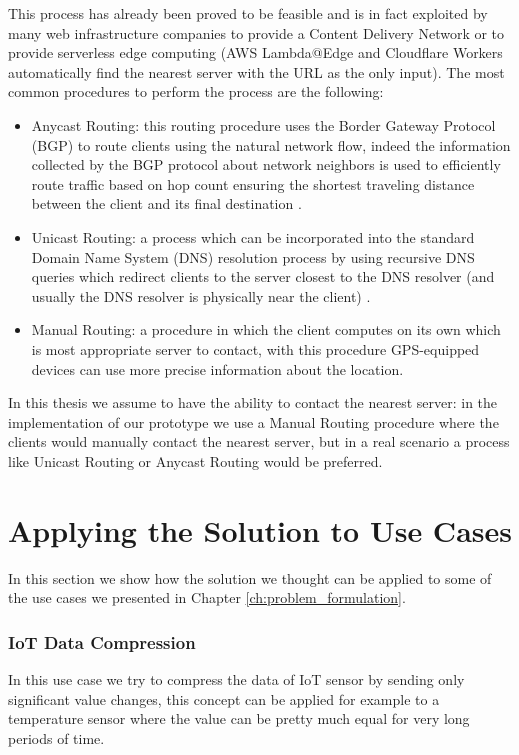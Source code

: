 This process has already been proved to be feasible and is in fact exploited by many web infrastructure companies to provide a Content Delivery Network or to provide serverless edge computing (AWS Lambda@Edge and Cloudflare Workers automatically find the nearest server with the URL as the only input). The most common procedures to perform the process are the following:
\begin{itemize}
    \item Anycast Routing: this routing procedure uses the Border Gateway Protocol (BGP) to route clients using the natural network flow, indeed the information collected by the BGP protocol about network neighbors is used to efficiently route traffic based on hop count ensuring the shortest traveling distance between the client and its final destination \cite{anycast-cloudflare}.
    \item Unicast Routing: a process which can be incorporated into the standard Domain Name System (DNS) resolution process by using recursive DNS queries which redirect clients to the server closest to the DNS resolver (and usually the DNS resolver is physically near the client) \cite{unicast-vs-anycast}.
    \item Manual Routing: a procedure in which the client computes on its own which is most appropriate server to contact, with this procedure GPS-equipped devices can use more precise information about the location.
\end{itemize}

In this thesis we assume to have the ability to contact the nearest server: in the implementation of our prototype we use a Manual Routing procedure where the clients would manually contact the nearest server, but in a real scenario a process like Unicast Routing or Anycast Routing would be preferred.


\section{Applying the Solution to Use Cases}
\label{sec:solution_use_cases}
In this section we show how the solution we thought can be applied to some of the use cases we presented in Chapter \ref{ch:problem_formulation}.


\subsubsection{IoT Data Compression}
In this use case we try to compress the data of IoT sensor by sending only significant value changes, this concept can be applied for example to a temperature sensor where the value can be pretty much equal for very long periods of time.


